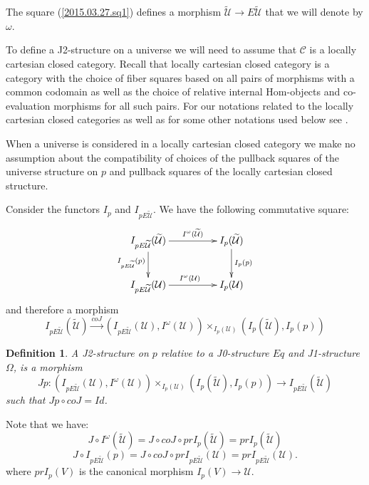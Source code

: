 \documentclass[12pt]{article}
\numberwithin{equation}{section}
\newenvironment{eq}{\begin{equation}}{\end{equation}}
\newtheorem{definition}[proposition]{Definition}
\newcommand{\llabel}[1]{\label{#1}}
\newcommand{\sr}{\rightarrow}
\newcommand{\lr}{\longrightarrow}
\newcommand{\wt}{\widetilde}
\newcommand{\U}{\mathcal{U}}
\begin{document}
The square (\ref{2015.03.27.sq1}) defines a morphism $\wt{\U}\sr E\wt{\U}$ that
we will denote by $\omega$.



To define a J2-structure on a universe we will need to assume that $\mathcal C$
is a locally cartesian closed category.  Recall that locally cartesian closed
category is a category with the choice of fiber squares based on all pairs of
morphisms with a common codomain as well as the choice of relative internal
Hom-objects and co-evaluation morphisms for all such pairs. For our notations
related to the locally cartesian closed categories as well as for some other
notations used below see \cite{fromunivwithPi}.

When a universe is considered in a locally cartesian closed category we make no
assumption about the compatibility of choices of the pullback squares of the
universe structure on $p$ and pullback squares of the locally cartesian closed
structure.

Consider the functors $I_{p}$ and $I_{pE\wt{\U}}$. We have the following
commutative square:
%
\begin{eq}\llabel{2010.sq1}
\begin{xy}
          \xymatrix@C=4pc{ I_{pE\wt{\U}}(\wt{\U}) \ar[r]^-{I^{\omega}(\wt{\U})}
            \ar[d]_{I_{pE\wt{\U}}(p)} & I_p(\wt{\U})
            \ar[d]^{I_p(p)}\\ I_{pE\wt{\U}}(\U) \ar[r]^{I^{\omega}(\U)} & I_p(\U) }
\end{xy}
\end{eq}
%
and therefore a morphism
%
$$I_{pE\wt{\U}}(\wt{\U}) \stackrel{coJ}{\lr} (I_{pE\wt{\U}}(\U), I^{\omega}(\U))
\times_{I_p(\U)} (I_p(\wt{\U}), I_p(p))
$$
%
\begin{definition}
\llabel{2015.03.27.def6} A J2-structure on $p$ relative to a J0-structure $Eq$
and J1-structure $\Omega$, is a morphism
%
$$ Jp:( I_{pE\wt{\U}}(\U), I^{\omega}(\U))\times_{I_p(\U)} (I_p(\wt{\U}), I_p(p))\sr
I_{pE\wt{\U}}(\wt{\U}) $$
%
such that $Jp\circ coJ = Id$.
\end{definition}
%
Note that we have:
%
\begin{eq}
\llabel{2015.04.04.eq1} J\circ I^{\omega}(\wt{\U})=J\circ coJ\circ
prI_p(\wt{\U})=prI_{p}(\wt{\U})
\end{eq}
%
\begin{eq}
\llabel{2015.04.04.eq2} J\circ I_{pE\wt{\U}}(p)=J\circ coJ\circ
prI_{pE\wt{\U}}(\U)=prI_{pE\wt{\U}}(\U).
\end{eq}
%
where $prI_p(V)$ is the canonical morphism $I_p(V)\sr \U$.
\end{document}
